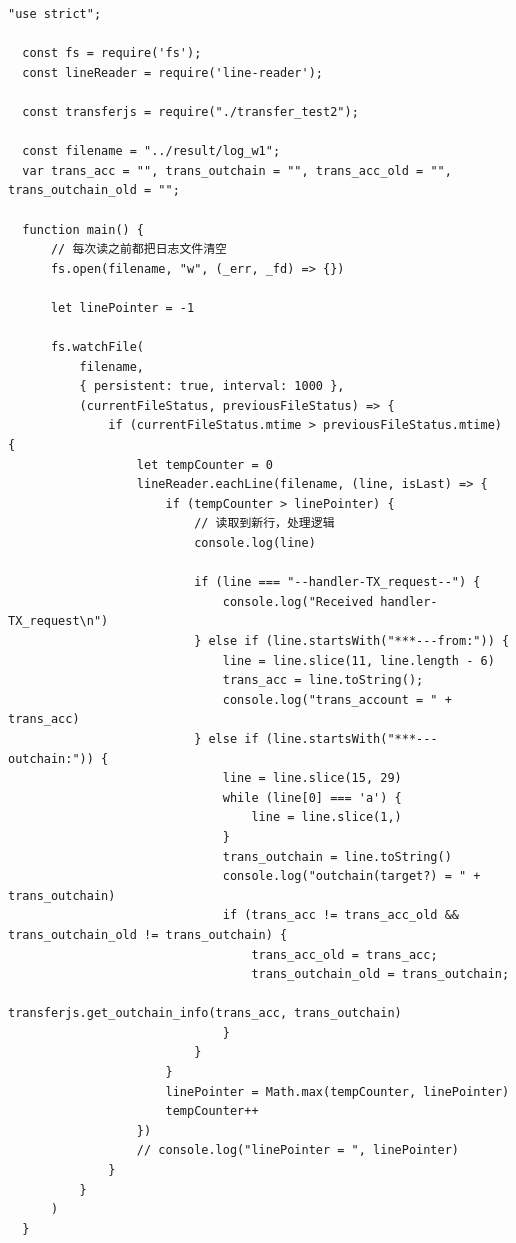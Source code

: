 \begin{lstlisting}[caption={修改后的监控日志脚本}]
  "use strict";

  const fs = require('fs');
  const lineReader = require('line-reader');

  const transferjs = require("./transfer_test2");

  const filename = "../result/log_w1";
  var trans_acc = "", trans_outchain = "", trans_acc_old = "", trans_outchain_old = "";

  function main() {
      // 每次读之前都把日志文件清空
      fs.open(filename, "w", (_err, _fd) => {})

      let linePointer = -1

      fs.watchFile(
          filename,
          { persistent: true, interval: 1000 },
          (currentFileStatus, previousFileStatus) => {
              if (currentFileStatus.mtime > previousFileStatus.mtime) {
                  let tempCounter = 0
                  lineReader.eachLine(filename, (line, isLast) => {
                      if (tempCounter > linePointer) {
                          // 读取到新行，处理逻辑
                          console.log(line)

                          if (line === "--handler-TX_request--") {
                              console.log("Received handler-TX_request\n")
                          } else if (line.startsWith("***---from:")) {
                              line = line.slice(11, line.length - 6)
                              trans_acc = line.toString();
                              console.log("trans_account = " + trans_acc)
                          } else if (line.startsWith("***---outchain:")) {
                              line = line.slice(15, 29)
                              while (line[0] === 'a') {
                                  line = line.slice(1,)
                              }
                              trans_outchain = line.toString()
                              console.log("outchain(target?) = " + trans_outchain)
                              if (trans_acc != trans_acc_old && trans_outchain_old != trans_outchain) {
                                  trans_acc_old = trans_acc;
                                  trans_outchain_old = trans_outchain;
                                  transferjs.get_outchain_info(trans_acc, trans_outchain)
                              }
                          }
                      }
                      linePointer = Math.max(tempCounter, linePointer)
                      tempCounter++
                  })
                  // console.log("linePointer = ", linePointer)
              }
          }
      )
  }


\end{lstlisting}

